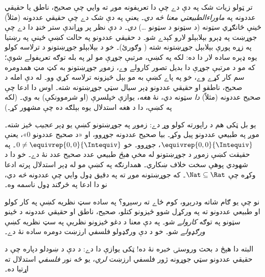 \documentclass[../../../include/open-logic-section]{subfiles}
\begin{document}
تر ټولو زيات شک په دې دے چې دا تعريفونه موږ ته وايي چې صحيح، ناطق
يا حقيقي عددونه په \emph{ماوراءالطبيعتي معنا څه دي}۔ يعنې په دې شک
دے چې حقيقي عددونه (مثلاً) ځينې ځانګړي سټونه (د سټونو د سټونو
\ldots) \emph{دي}۔ د دې نظر پر وړاندې ستر خنډ دا دے چې جوړښت په
ډېرو بېلابېلو لارو کېدے شو۔ د حقيقي عددونو په حالت کښې ځينې په
رښتيا په زړه پورې بېلابېل جوړښتونه شته (
وګورئ)۔ خو د بېلابېلو جوړښتونو د ترلاسه کولو يوه ډېره ساده لار دا
ده: لکه په  کښې، مرتبې جوړې مو لږ په
بله توګه تعريفولے شوې؛ که مو د مرتبې جوړې دا بديل تصور کارولے وے،
زموږ جوړښتونو به کټ مټ همدومره سم کار کړے وے، خو په پاے کښې به مو
بېل څيزونه ترلاسه کړي وو۔ له دې امله د صحيح، ناطقو او حقيقي عددونو
ډېر سيال سټي جوړښتونه شته۔ اوس دا ادعا چې صحيح عددونه (مثلاً)
\emph{دا} سټونه دي، نۀ \emph{هغه}، يوازې خپلسرې (او شرموونکې) به
وي۔ (لکه په  کښې، دا د هغه استدلال يوه
بېلګه ده چې \citealt{Benacerraf1965} مشهور کړ۔)

يو بل ټکی هم د راپورته کولو وړ دے: زموږ په جوړښتونو کښې يو ډېر
\emph{عجيب} څيز شته۔ موږ په طبيعي عددونو پيل وکړ۔ بيا صحيح عددونه
جوړوو، او «د صحيح عددونو $0$»، يعنې
$ \equivrep{0,0}{\Intequiv}$، جوړوو۔ خو
$0 \neq \equivrep{0,0}{\Intequiv}$۔ په حقيقت کښې زموږ د جوړښتونو
له مخې \emph{هېڅ} طبيعي عدد صحيح عدد نۀ دے۔ خو دا د شهودي پوهې
سخت خلاف ښکاري۔ همدارنګه په  کښې مو له
ډېر استدلال پرته ادعا وکړه چې $\Nat \subseteq \Rat$۔ که جوړښتونه
موږ ته په دقيق ډول وايي چې عددونه \emph{څه} دي، نو دا ادعا په
څرګند ډول ناسمه وه۔

نو چې يو ګام شاته ودرېږو، کوم ځاے ته رسېږو؟ په ساده سټ نظريه کښې
په کار کولو او طبيعي عددونو ته په ورکړل شوو څيزونو کتلو، صحيح، ناطق
او حقيقي عددونه د ځينو سټونو په توګه \emph{کارولے} شو۔ په دې معنا
د دغو څيزونو نظريې په سټ نظريه کښې \emph{ورګډولے} شو۔ خو د دې
ورګډولو فلسفي ارزښت دومره ساده نۀ دے۔

البته دا هېڅ د بحث وروستۍ خبره نۀ ده!{} ټکی يوازې دا دے: د دې د
ښودلو دپاره چې د حقيقي عددونو سټي جوړونه ژور فلسفي ارزښت \emph{لري}،
يو څه نور \emph{فلسفي} استدلال ته اړتيا ده۔

\end{document}
